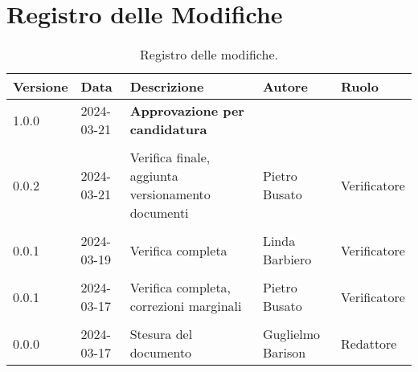 \section*{Registro delle Modifiche}
\begin{table}[ht!]	
	\centering
	\begin{tabular}{p{1.2cm} p{2cm} p{6cm} p{3cm} p{2cm}}
		\toprule
		\textbf{Versione}& \textbf{Data} & \textbf{Descrizione} & \textbf{Autore} & \textbf{Ruolo} \\
		\midrule
		1.0.0 & 2024-03-21 & \textbf{Approvazione per candidatura} & \\\\
		0.0.2 & 2024-03-21 & Verifica finale, aggiunta versionamento documenti   & Pietro Busato & Verificatore \\\\
		0.0.1 & 2024-03-19 & Verifica completa  & Linda Barbiero & Verificatore \\\\
		0.0.1 & 2024-03-17 & Verifica completa, correzioni marginali  & Pietro Busato & Verificatore \\\\
		0.0.0 & 2024-03-17 & Stesura del documento  & Guglielmo Barison & Redattore \\
		\bottomrule
	\end{tabular}
	\caption{Registro delle modifiche.}
	\label{table:Registro delle modifiche}
\end{table}
\newpage

